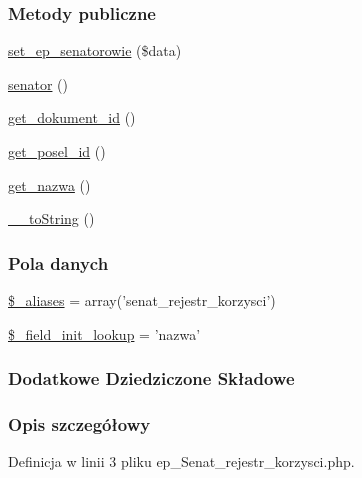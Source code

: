 \subsubsection*{Metody publiczne}
\begin{DoxyCompactItemize}
\item 
\hyperlink{classep___senat__rejestr__korzysci_a92c4ef3c275a33bee3292b42c47233cd}{set\-\_\-ep\-\_\-senatorowie} (\$data)
\item 
\hyperlink{classep___senat__rejestr__korzysci_af076312b536f7707cda87563bd9113d9}{senator} ()
\item 
\hyperlink{classep___senat__rejestr__korzysci_adc3366b534d8e1e2570fd6a80624d7ed}{get\-\_\-dokument\-\_\-id} ()
\item 
\hyperlink{classep___senat__rejestr__korzysci_ae47740401fd789790ece81a1b64abfb2}{get\-\_\-posel\-\_\-id} ()
\item 
\hyperlink{classep___senat__rejestr__korzysci_ac0818f0049d7b84f08f77128f54cee36}{get\-\_\-nazwa} ()
\item 
\hyperlink{classep___senat__rejestr__korzysci_a7516ca30af0db3cdbf9a7739b48ce91d}{\-\_\-\-\_\-to\-String} ()
\end{DoxyCompactItemize}
\subsubsection*{Pola danych}
\begin{DoxyCompactItemize}
\item 
\hyperlink{classep___senat__rejestr__korzysci_ab4e31d75f0bc5d512456911e5d01366b}{\$\-\_\-aliases} = array('senat\-\_\-rejestr\-\_\-korzysci')
\item 
\hyperlink{classep___senat__rejestr__korzysci_a4a4d54ae35428077a7c61ec8a5139af3}{\$\-\_\-field\-\_\-init\-\_\-lookup} = 'nazwa'
\end{DoxyCompactItemize}
\subsubsection*{Dodatkowe Dziedziczone Składowe}


\subsubsection{Opis szczegółowy}


Definicja w linii 3 pliku ep\-\_\-\-Senat\-\_\-rejestr\-\_\-korzysci.\-php.



